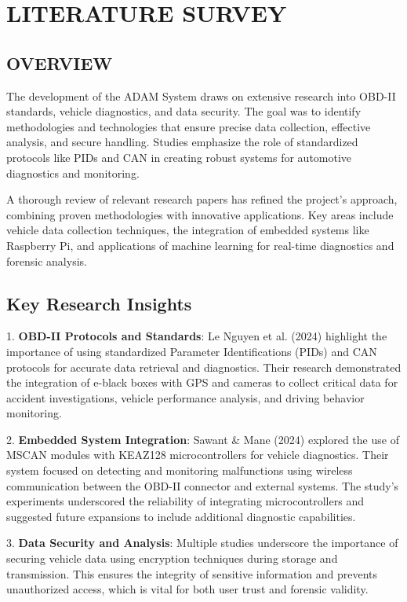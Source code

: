 \section{LITERATURE SURVEY}
\subsection{OVERVIEW}
The development of the ADAM System draws on extensive research into OBD-II standards, vehicle diagnostics, and data security. The goal was to identify methodologies and technologies that ensure precise data collection, effective analysis, and secure handling. Studies emphasize the role of standardized protocols like PIDs and CAN in creating robust systems for automotive diagnostics and monitoring.

A thorough review of relevant research papers has refined the project’s approach, combining proven methodologies with innovative applications. Key areas include vehicle data collection techniques, the integration of embedded systems like Raspberry Pi, and applications of machine learning for real-time diagnostics and forensic analysis.

\subsection{Key Research Insights}
1. \textbf{OBD-II Protocols and Standards}: Le Nguyen et al. (2024) highlight the importance of using standardized Parameter Identifications (PIDs) and CAN protocols for accurate data retrieval and diagnostics. Their research demonstrated the integration of e-black boxes with GPS and cameras to collect critical data for accident investigations, vehicle performance analysis, and driving behavior monitoring.

2. \textbf{Embedded System Integration}: Sawant \& Mane (2024) explored the use of MSCAN modules with KEAZ128 microcontrollers for vehicle diagnostics. Their system focused on detecting and monitoring malfunctions using wireless communication between the OBD-II connector and external systems. The study’s experiments underscored the reliability of integrating microcontrollers and suggested future expansions to include additional diagnostic capabilities.

3. \textbf{Data Security and Analysis}: Multiple studies underscore the importance of securing vehicle data using encryption techniques during storage and transmission. This ensures the integrity of sensitive information and prevents unauthorized access, which is vital for both user trust and forensic validity.

